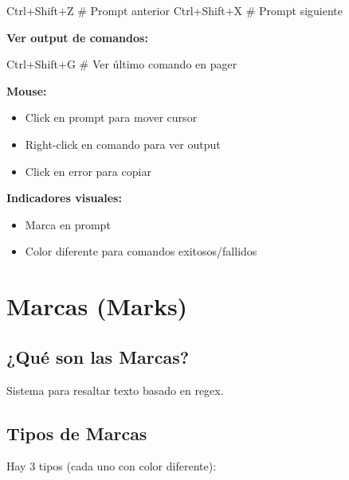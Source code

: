 \documentclass[
  doc,
  floatsintext,
  longtable,
  a4paper,
  nolmodern,
  notxfonts,
  notimes,
  12pt,
  colorlinks=true,linkcolor=blue,citecolor=blue,urlcolor=blue]{apa7}
\newenvironment{Shaded}{\begin{snugshade}}{\end{snugshade}}
\newcommand{\CommentTok}[1]{\textcolor[rgb]{0.37,0.37,0.37}{#1}}
\newcommand{\ExtensionTok}[1]{\textcolor[rgb]{0.00,0.23,0.31}{#1}}
\providecommand{\tightlist}{%
  \setlength{\itemsep}{0pt}\setlength{\parskip}{0pt}}
\begin{document}
\begin{Shaded}
\begin{Highlighting}[]
\ExtensionTok{Ctrl+Shift+Z}  \CommentTok{\# Prompt anterior}
\ExtensionTok{Ctrl+Shift+X}  \CommentTok{\# Prompt siguiente}
\end{Highlighting}
\end{Shaded}

\textbf{Ver output de comandos:}

\begin{Shaded}
\begin{Highlighting}[]
\ExtensionTok{Ctrl+Shift+G}  \CommentTok{\# Ver último comando en pager}
\end{Highlighting}
\end{Shaded}

\textbf{Mouse:}

\begin{itemize}
\tightlist
\item
  Click en prompt para mover cursor
\item
  Right-click en comando para ver output
\item
  Click en error para copiar
\end{itemize}

\textbf{Indicadores visuales:}

\begin{itemize}
\tightlist
\item
  Marca en prompt
\item
  Color diferente para comandos exitosos/fallidos
\end{itemize}

\section{Marcas (Marks)}\label{marcas-marks}

\subsection{¿Qué son las Marcas?}\label{quuxe9-son-las-marcas}

Sistema para resaltar texto basado en regex.

\subsection{Tipos de Marcas}\label{tipos-de-marcas}

Hay 3 tipos (cada uno con color diferente):
\end{document}
